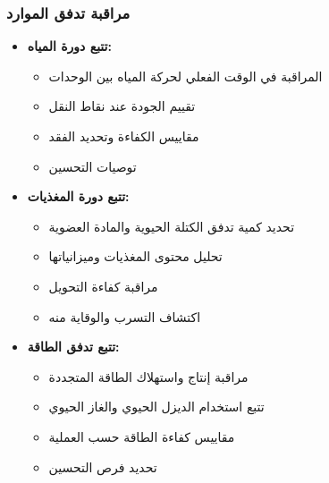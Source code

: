 \subsubsection{مراقبة تدفق الموارد}
\begin{itemize}
    \item \textbf{تتبع دورة المياه:}
    \begin{itemize}
        \item المراقبة في الوقت الفعلي لحركة المياه بين الوحدات
        \item تقييم الجودة عند نقاط النقل
        \item مقاييس الكفاءة وتحديد الفقد
        \item توصيات التحسين
    \end{itemize}
    
    \item \textbf{تتبع دورة المغذيات:}
    \begin{itemize}
        \item تحديد كمية تدفق الكتلة الحيوية والمادة العضوية
        \item تحليل محتوى المغذيات وميزانياتها
        \item مراقبة كفاءة التحويل
        \item اكتشاف التسرب والوقاية منه
    \end{itemize}
    
    \item \textbf{تتبع تدفق الطاقة:}
    \begin{itemize}
        \item مراقبة إنتاج واستهلاك الطاقة المتجددة
        \item تتبع استخدام الديزل الحيوي والغاز الحيوي
        \item مقاييس كفاءة الطاقة حسب العملية
        \item تحديد فرص التحسين
    \end{itemize}
\end{itemize}

